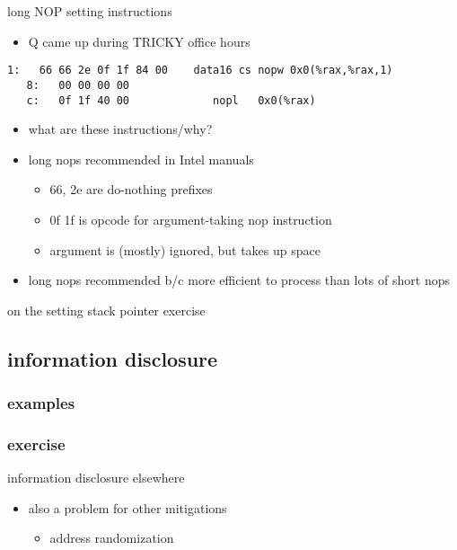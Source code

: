 \begin{frame}[fragile]{long NOP setting instructions}
    \begin{itemize}
    \item Q came up during TRICKY office hours
    \end{itemize}
\begin{Verbatim}[fontsize=\fontsize{9}{10}]
   1:   66 66 2e 0f 1f 84 00    data16 cs nopw 0x0(%rax,%rax,1)
   8:   00 00 00 00 
   c:   0f 1f 40 00             nopl   0x0(%rax)
\end{Verbatim}
\begin{itemize}
\item what are these instructions/why?
\item long nops recommended in Intel manuals
    \begin{itemize}
    \item 66, 2e are do-nothing prefixes
    \item 0f 1f is opcode for argument-taking nop instruction
    \item argument is (mostly) ignored, but takes up space
    \end{itemize}
\item long nops recommended b/c more efficient to process than lots of short nops
\end{itemize}
\end{frame}

\begin{frame}{on the setting stack pointer exercise}
\end{frame}



\subsection{information disclosure}
\subsubsection{examples}



\subsubsection{exercise}


\begin{frame}{information disclosure elsewhere}
    \begin{itemize}
    \item also a problem for other mitigations
        \begin{itemize}
        \item address randomization
        \end{itemize}
    \end{itemize}
\end{frame}

